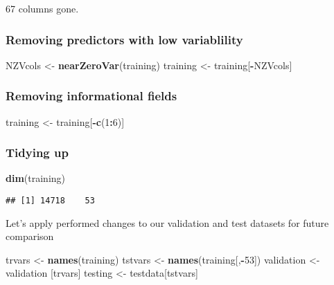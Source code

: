 \documentclass[]{article}
\newenvironment{Shaded}{\begin{snugshade}}{\end{snugshade}}
\newcommand{\KeywordTok}[1]{\textcolor[rgb]{0.13,0.29,0.53}{\textbf{#1}}}
\newcommand{\DecValTok}[1]{\textcolor[rgb]{0.00,0.00,0.81}{#1}}
\newcommand{\StringTok}[1]{\textcolor[rgb]{0.31,0.60,0.02}{#1}}
\newcommand{\OperatorTok}[1]{\textcolor[rgb]{0.81,0.36,0.00}{\textbf{#1}}}
\newcommand{\NormalTok}[1]{#1}
\begin{document}
67 columns gone.

\subsubsection{Removing predictors with low
variablility}\label{removing-predictors-with-low-variablility}

\begin{Shaded}
\begin{Highlighting}[]
\NormalTok{NZVcols <-}\StringTok{ }\KeywordTok{nearZeroVar}\NormalTok{(training)}
\NormalTok{training <-}\StringTok{ }\NormalTok{training[}\OperatorTok{-}\NormalTok{NZVcols]}
\end{Highlighting}
\end{Shaded}

\subsubsection{Removing informational
fields}\label{removing-informational-fields}

\begin{Shaded}
\begin{Highlighting}[]
\NormalTok{training <-}\StringTok{ }\NormalTok{training[}\OperatorTok{-}\KeywordTok{c}\NormalTok{(}\DecValTok{1}\OperatorTok{:}\DecValTok{6}\NormalTok{)]}
\end{Highlighting}
\end{Shaded}

\subsubsection{Tidying up}\label{tidying-up}

\begin{Shaded}
\begin{Highlighting}[]
\KeywordTok{dim}\NormalTok{(training)}
\end{Highlighting}
\end{Shaded}

\begin{verbatim}
## [1] 14718    53
\end{verbatim}

Let's apply performed changes to our validation and test datasets for
future comparison

\begin{Shaded}
\begin{Highlighting}[]
\NormalTok{trvars <-}\StringTok{ }\KeywordTok{names}\NormalTok{(training)}
\NormalTok{tstvars <-}\StringTok{ }\KeywordTok{names}\NormalTok{(training[,}\OperatorTok{-}\DecValTok{53}\NormalTok{])}
\NormalTok{validation <-}\StringTok{ }\NormalTok{validation [trvars]}
\NormalTok{testing <-}\StringTok{ }\NormalTok{testdata[tstvars]}
\end{Highlighting}
\end{Shaded}
\end{document}
